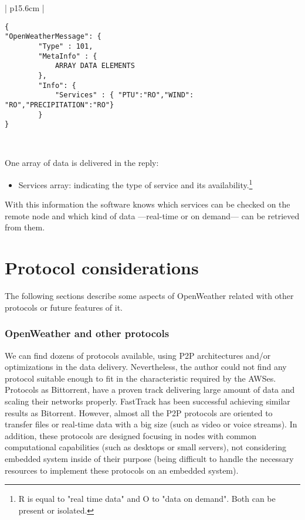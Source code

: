 \begin{table}[H]
\centering
\begin{tabular}{| p{15.6cm} |}
\hline
\begin{minipage}[t]{\linewidth}
	\begin{verbatim}
{
"OpenWeatherMessage": {
        "Type" : 101,
        "MetaInfo" : {
            ARRAY DATA ELEMENTS
        },
        "Info": {
            "Services" : { "PTU":"RO","WIND": "RO","PRECIPITATION":"RO"}
        }
}
\end{verbatim}
\end{minipage} \\
\hline
\end{tabular}
\caption{Peer's list exchange in OpenWeather protocol.}
\end{table}

One array of data is delivered in the reply:

\begin{itemize}
\item Services array: indicating the type of service and its availability.\footnote{R is equal to "real time data" and O to "data on demand". Both can be present or isolated.}
\end{itemize}

With this information the software knows which services can be checked on the remote node and which kind of data —real-time or on demand— can be retrieved from them.

\section{Protocol considerations}

The following sections describe some aspects of OpenWeather related with other protocols or future features of it.

\subsubsection{OpenWeather and other protocols}

We can find dozens of protocols available, using \gls{P2P} architectures and/or optimizations in the data delivery. Nevertheless, the author could not find any protocol suitable enough to fit in the characteristic required by the \gls{AWS}es. Protocols as Bittorrent\cite{BITORRENT}, have a proven track delivering large amount of data and scaling their networks properly. FastTrack\cite{FASTRACK} has been successful achieving similar results as Bitorrent. However, almost all the \gls{P2P} protocols are oriented to transfer files or real-time data with a big size (such as video or voice streams). In addition, these protocols are designed focusing in nodes with common computational capabilities (such as desktops or small servers), not considering embedded system inside of their purpose (being difficult to handle the necessary resources to implement these protocols on an embedded system).

